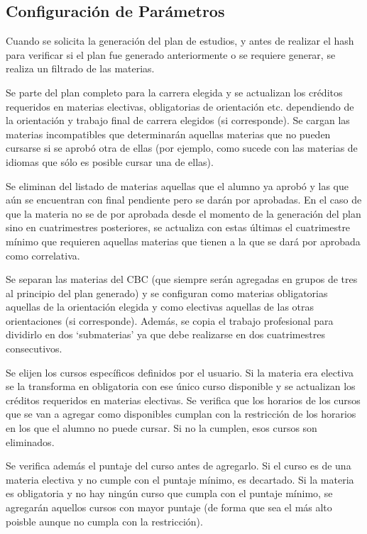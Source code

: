 \documentclass[a4paper]{article}
\begin{document}
\subsection{Configuración de Parámetros}
Cuando se solicita la generación del plan de estudios, y antes de realizar el hash para verificar si el plan fue generado anteriormente o se requiere generar, se realiza un filtrado de las materias.

Se parte del plan completo para la carrera elegida y se actualizan los créditos requeridos en materias electivas, obligatorias de orientación etc. dependiendo de la orientación y trabajo final de carrera elegidos (si corresponde). Se cargan las materias incompatibles que determinarán aquellas materias que no pueden cursarse si se aprobó otra de ellas (por ejemplo, como sucede con las materias de idiomas que sólo es posible cursar una de ellas).

Se eliminan del listado de materias aquellas que el alumno ya aprobó y las que aún se encuentran con final pendiente pero se darán por aprobadas. En el caso de que la materia no se de por aprobada desde el momento de la generación del plan sino en cuatrimestres posteriores, se actualiza con estas últimas el cuatrimestre mínimo que requieren aquellas materias que tienen a la que se dará por aprobada como correlativa.

Se separan las materias del CBC (que siempre serán agregadas en grupos de tres al principio del plan generado) y se configuran como materias obligatorias aquellas de la orientación elegida y como electivas aquellas de las otras orientaciones (si corresponde). Además, se copia el trabajo profesional para dividirlo en dos `submaterias' ya que debe realizarse en dos cuatrimestres consecutivos.

Se elijen los cursos específicos definidos por el usuario. Si la materia era electiva se la transforma en obligatoria con ese único curso disponible y se actualizan los créditos requeridos en materias electivas. Se verifica que los horarios de los cursos que se van a agregar como disponibles cumplan con la restricción de los horarios en los que el alumno no puede cursar. Si no la cumplen, esos cursos son eliminados.

Se verifica además el puntaje del curso antes de agregarlo. Si el curso es de una materia electiva y no cumple con el puntaje mínimo, es decartado. Si la materia es obligatoria y no hay ningún curso que cumpla con el puntaje mínimo, se agregarán aquellos cursos con mayor puntaje (de forma que sea el más alto poisble aunque no cumpla con la restricción).
\end{document}
